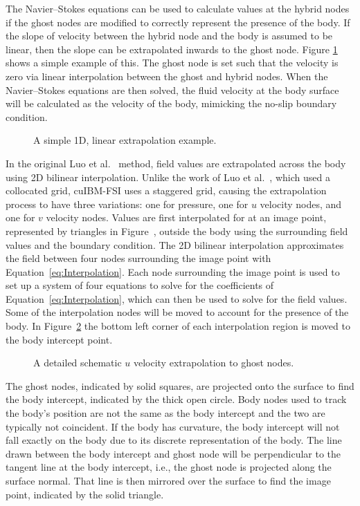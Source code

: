 The Navier--Stokes equations can be used to calculate values at the hybrid nodes if the ghost nodes are modified to correctly represent the presence of the body. 
If the slope of velocity between the hybrid node and the body is assumed to be linear, then the slope can be extrapolated inwards to the ghost node. 
Figure \ref{Fig: Simple Interpolation} shows a simple example of this. 
The ghost node is set such that the velocity is zero via linear interpolation between the ghost and hybrid nodes. 
When the Navier--Stokes equations are then solved, the fluid velocity at the body surface will be calculated as the velocity of the body, mimicking the no-slip boundary condition. 
\begin{figure}[!htb]
	\centering
	
	\caption{A simple 1D, linear extrapolation example.}
	\label{Fig: Simple Interpolation}
\end{figure}
In the original Luo et al.~\cite{Luo:2012gx} method, field values are extrapolated across the body using 2D bilinear interpolation. 
Unlike the work of Luo et al.~\cite{Luo:2012gx}, which used a collocated grid, cuIBM-FSI uses a staggered grid, causing the extrapolation process to have three variations: one for pressure, one for $u$ velocity nodes, and one for $v$ velocity nodes. 
Values are first interpolated for at an image point, represented by triangles in Figure~\cite{fig:Ghost node extrapolation}, outside the body using the surrounding field values and the boundary condition. 
The 2D bilinear interpolation approximates the field between four nodes surrounding the image point with Equation~\eqref{eq:Interpolation}. 
Each node surrounding the image point is used to set up a system of four equations to solve for the coefficients of Equation~\eqref{eq:Interpolation}, which can then be used to solve for the field values. 
Some of the interpolation nodes will be moved to account for the presence of the body.
In Figure~\ref{fig:Ghost node extrapolation} the bottom left corner of each interpolation region is moved to the body intercept point.
\begin{figure}[!htb]
	\centering
	
	\caption{A detailed schematic $u$ velocity extrapolation to ghost nodes.}
	\label{fig:Ghost node extrapolation}
\end{figure}

The ghost nodes, indicated by solid squares, are projected onto the surface to find the body intercept, indicated by the thick open circle. 
Body nodes used to track the body's position are not the same as the body intercept and the two are typically not coincident. 
If the body has curvature, the body intercept will not fall exactly on the body due to its discrete representation of the body. 
The line drawn between the body intercept and ghost node will be perpendicular to the tangent line at the body intercept, i.e., the ghost node is projected along the surface normal. 
That line is then mirrored over the surface to find the image point, indicated by the solid triangle. 

